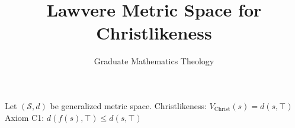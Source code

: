 \documentclass{article}
\begin{document}
\title{Lawvere Metric Space for Christlikeness}
\author{Graduate Mathematics Theology}
\maketitle

\begin{theorem}

Let $(\mathcal{S}, d)$ be generalized metric space.
Christlikeness: $V_{\text{Christ}}(s) = d(s, \top)$
Axiom C1: $d(f(s), \top) \leq d(s, \top)$
            
\end{theorem}
\end{document}
